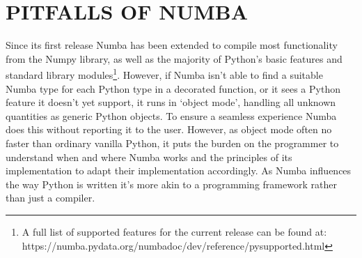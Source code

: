 \documentclass{IEEEcsmag}
\begin{document}





\section{PITFALLS OF NUMBA}\label{sec:pitfalls}

Since its first release Numba has been extended to compile most functionality from the Numpy library, as well as the majority of Python's basic features and standard library modules\footnote{A full list of supported features for the current release can be found at: https://numba.pydata.org/numba\-doc/dev/reference/pysupported.html}. However, if Numba isn't able to find a suitable Numba type for each Python type in a decorated function, or it sees a Python feature it doesn't yet support, it runs in `object mode', handling all unknown quantities as generic Python objects. To ensure a seamless experience Numba does this without reporting it to the user. However, as object mode often no faster than ordinary vanilla Python, it puts the burden on the programmer to understand when and where Numba works and the principles of its implementation to adapt their implementation accordingly. As Numba influences the way Python is written it's more akin to a programming framework rather than just a compiler.
\end{document}
